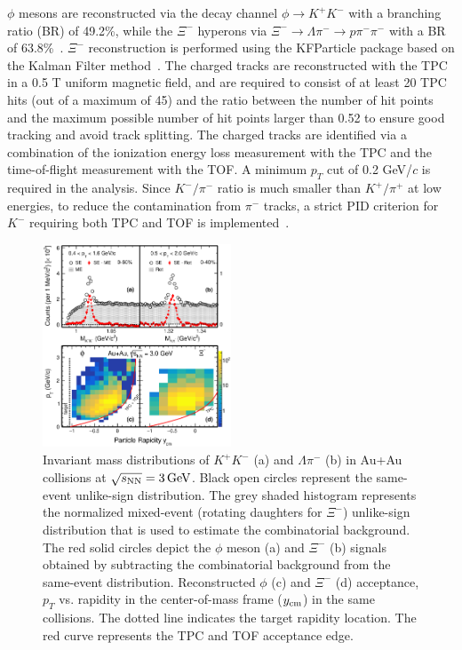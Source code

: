 \documentclass[%
 reprint,	
showpacs,
 amsmath,amssymb,
 aps,
 superscriptaddress,
]{revtex4-1}
\begin{document}
$\phi$ mesons are reconstructed via the decay channel $\phi\rightarrow K^+K^-$ with a branching ratio (BR) of 49.2\%, while the $\Xi^{-}$ hyperons via $\Xi^-\rightarrow \Lambda\pi^-\rightarrow p\pi^-\pi^-$ with a BR of 63.8\%~\cite{pdg}. $\Xi^-$ reconstruction is performed using the KFParticle package based on the Kalman Filter method~\cite{Kisel:2018nvd,STAR_PRL_Xi_Oemga_polarization}. The charged tracks are reconstructed with the TPC in a 0.5 T uniform magnetic field, and are required to consist of at least 20 TPC hits (out of a maximum of 45) and the ratio between the number of hit points and the maximum possible number of hit points larger than 0.52 to ensure good tracking and avoid track splitting. %
The charged tracks are identified via a combination of the ionization energy loss %
measurement with the TPC and the time-of-flight %
measurement with the TOF. A minimum $p_T$ cut of 0.2 GeV/$c$ is required in the analysis.
Since $K^{-}/\pi^{-}$ ratio is much smaller than $K^{+}/\pi^{+}$ at low energies, to reduce the contamination from $\pi^{-}$ tracks, a strict PID criterion for $K^{-}$ requiring both TPC and TOF is implemented~\cite{Xu:2008th,Shao:2005iu}.



\begin{figure}
\centering
\hspace*{-4mm}
\includegraphics[width=0.50\textwidth]{fig1_signal.eps}
  \caption{Invariant mass distributions of $K^+K^-$ (a) and  $\Lambda\pi^-$ (b) in Au+Au collisions at ${\sqrt{s_{\rm NN}} = \rm{3\,GeV}}$. Black open circles represent the same-event unlike-sign distribution. The grey shaded histogram represents the normalized mixed-event (rotating daughters for $\Xi^-$) unlike-sign distribution that is used to estimate the combinatorial background. The red solid circles depict the $\phi$ meson (a) and $\Xi^-$ (b) signals obtained by subtracting the combinatorial background from the same-event distribution. Reconstructed $\phi$ (c) and $\Xi^-$ (d) acceptance, $p_T$ vs. rapidity in the center-of-mass frame ($y_{\rm cm}$) in the same collisions. The dotted line indicates the target rapidity location. The red curve represents the TPC and TOF acceptance edge.}
\label{fig:phiSignal} 
\end{figure}
\end{document}
